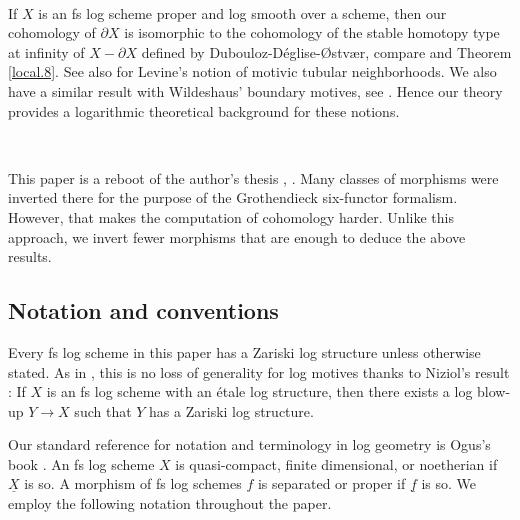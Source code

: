 \documentclass[10pt]{amsart}
\theoremstyle{definition}
\theoremstyle{remark}
\numberwithin{equation}{subsection}
\newcommand{\ul}{\underline}
\begin{document}
\

If $X$ is an fs log scheme proper and log smooth over a scheme, then our cohomology of $\partial X$ is isomorphic to the cohomology of the stable homotopy type at infinity of $X-\partial X$ defined by Dubouloz-D\'eglise-{\O}stv{\ae}r, compare \cite[(4.4.3.a)]{2206.01564} and Theorem \ref{local.8}.
See also \cite{MR2302525} for Levine's notion of motivic tubular neighborhoods.
We also have a similar result with Wildeshaus' boundary motives, see \cite[Proposition 2.4]{zbMATH05042488}.
Hence our theory provides a logarithmic theoretical background for these notions.

\

This paper is a reboot of the author's thesis \cite{ParThesis},  \cite{1707.09435}.
Many classes of morphisms were inverted there for the purpose of the Grothendieck six-functor formalism.
However, that makes the computation of cohomology harder.
Unlike this approach, we invert fewer morphisms that are enough to deduce the above results.





\subsection*{Notation and conventions}
Every fs log scheme in this paper has a Zariski log structure unless otherwise stated.
As in \cite{logDM},
this is no loss of generality for log motives thanks to Niziol's result \cite[Theorem 5.10]{Niz}:
If $X$ is an fs log scheme with an \'etale log structure,
then there exists a log blow-up $Y\to X$ such that $Y$ has a Zariski log structure.


Our standard reference for notation and terminology in log geometry is Ogus's book \cite{Ogu}.
An fs log scheme $X$ is quasi-compact, finite dimensional, or noetherian if $\ul{X}$ is so.
A morphism of fs log schemes $f$ is separated or proper if $\ul{f}$ is so.
We employ the following notation throughout the paper.
\end{document}

